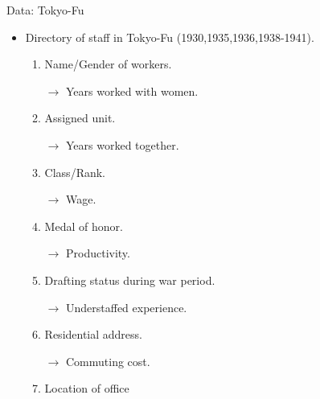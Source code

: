 \begin{frame}{Data: Tokyo-Fu}
    \begin{itemize}
        \item Directory of staff in Tokyo-Fu (1930,1935,1936,1938-1941).
        \begin{enumerate}
            \item Name/Gender of workers.

            $\rightarrow$\color{red} Years worked with women.\color{black}

            \item Assigned unit.

            $\rightarrow$\color{red} Years worked together.\color{black}
            
            \item Class/Rank.
            
            $\rightarrow$\color{red} Wage.\color{black}
            
            \item Medal of honor.
            
            $\rightarrow$\color{red} Productivity.\color{black}
            
            \item Drafting status during war period.
            
            $\rightarrow$\color{red} Understaffed experience.\color{black}
            
            \item Residential address.
            
            $\rightarrow$\color{red} Commuting cost.\color{black}
            \item Location of office
        \end{enumerate}
    \end{itemize}    
\end{frame}

